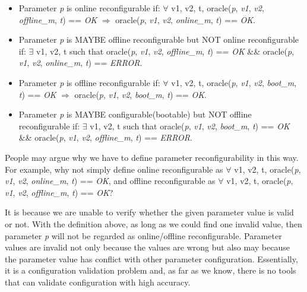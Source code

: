\begin{itemize}[leftmargin=*]
\vspace{-.1in}
\item 
Parameter \textit{p} is online reconfigurable if: $\forall$ v1, v2, t, oracle(\textit{p}, \textit{v1}, \textit{v2}, \textit{offline\_m}, \textit{t}) == \textit{OK} $\Longrightarrow$ oracle(\textit{p}, \textit{v1}, \textit{v2}, \textit{online\_m}, \textit{t}) == \textit{OK}.

\vspace{-.1in}
\item 
Parameter \textit{p} is MAYBE offline reconfigurable but NOT online reconfigurable if: $\exists$ v1, v2, t such that oracle(\textit{p}, \textit{v1}, \textit{v2}, \textit{offline\_m}, \textit{t}) == \textit{OK} \&\& oracle(\textit{p}, \textit{v1}, \textit{v2}, \textit{online\_m}, \textit{t}) == \textit{ERROR}.

\vspace{-.1in}
\item 
Parameter \textit{p} is offline reconfigurable if: $\forall$ v1, v2, t, oracle(\textit{p}, \textit{v1}, \textit{v2}, \textit{boot\_m}, \textit{t}) == \textit{OK} $\Longrightarrow$ oracle(\textit{p}, \textit{v1}, \textit{v2}, \textit{boot\_m}, \textit{t}) == \textit{OK}.

\vspace{-.1in}
\item 
Parameter \textit{p} is MAYBE configurable(bootable) but NOT offline reconfigurable if: $\exists$ v1, v2, t such that oracle(\textit{p}, \textit{v1}, \textit{v2}, \textit{boot\_m}, \textit{t}) == \textit{OK} \&\& oracle(\textit{p}, \textit{v1}, \textit{v2}, \textit{offline\_m}, \textit{t}) == \textit{ERROR}.
\end{itemize}

People may argue why we have to define parameter reconfigurability in this way. For example, why not simply define online reconfigurable as $\forall$ v1, v2, t, oracle(\textit{p}, \textit{v1}, \textit{v2}, \textit{online\_m}, \textit{t}) == \textit{OK}, and offline reconfigurable as $\forall$ v1, v2, t, oracle(\textit{p}, \textit{v1}, \textit{v2}, \textit{offline\_m}, \textit{t}) == \textit{OK}?

It is because we are unable to verify whether the given parameter value is valid or not. With the definition above, as long as we could find one invalid value, then parameter \textit{p} will not be regarded as online/offline reconfigurable. Parameter values are invalid not only because the values are wrong but also may because the parameter value has conflict with other parameter configuration. Essentially, it is a configuration validation problem and, as far as we know, there is no tools that can validate configuration with high accuracy. 

